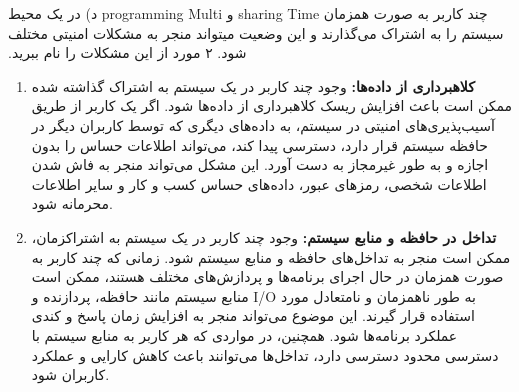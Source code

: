 د) در یک محیط programming Multi و sharing Time ‫چند‬ ‫کا‬ربر به‬ ‫صورت‬ ‫همزمان‬ ‫سیستم‬ ‫را‬ ‫به‬ ‫اشتراک‬ می‌گذارند ‫و‬ این‬ ‫وضعیت‬ ‫می‬‫تواند‬ ‫منجر‬ به مشکلات امنیتی‬ ‫مختلف‬ ‫شود. ۲ مورد از این مشکلات را نام ببرید.
\begin{qsolve}
\begin{enumerate}
	\item \textbf{کلاهبرداری از داده‌ها: }وجود چند کاربر در یک سیستم به اشتراک گذاشته شده ممکن است باعث افزایش ریسک کلاهبرداری از داده‌ها شود. اگر یک کاربر از طریق آسیب‌پذیری‌های امنیتی در سیستم، به داده‌های دیگری که توسط کاربران دیگر در حافظه سیستم قرار دارد، دسترسی پیدا کند، می‌تواند اطلاعات حساس را بدون اجازه و به طور غیرمجاز به دست آورد. این مشکل می‌تواند منجر به فاش شدن اطلاعات شخصی، رمزهای عبور، داده‌های حساس کسب و کار و سایر اطلاعات محرمانه شود.
	
	\item \textbf{تداخل در حافظه و منابع سیستم: } وجود چند کاربر در یک سیستم به اشتراکزمان، ممکن است منجر به تداخل‌های حافظه و منابع سیستم شود. زمانی که چند کاربر به صورت همزمان در حال اجرای برنامه‌ها و پردازش‌های مختلف هستند، ممکن است منابع سیستم مانند حافظه، پردازنده و I/O به طور ناهمزمان و نامتعادل مورد استفاده قرار گیرند. این موضوع می‌تواند منجر به افزایش زمان پاسخ و کندی عملکرد برنامه‌ها شود. همچنین، در مواردی که هر کاربر به منابع سیستم با دسترسی محدود دسترسی دارد، تداخل‌ها می‌توانند باعث کاهش کارایی و عملکرد کاربران شود.
\end{enumerate}
\end{qsolve}